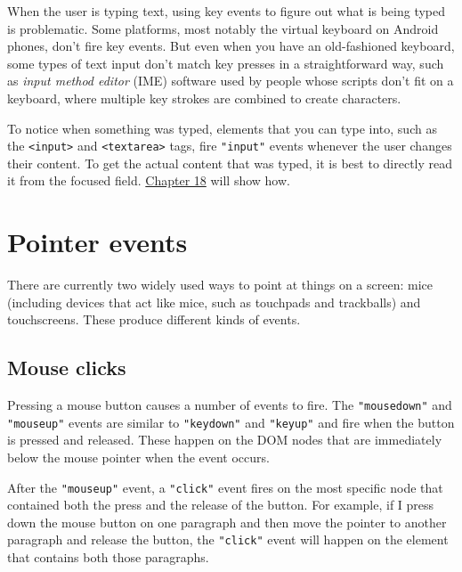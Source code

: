 When the user is typing text, using key events to figure out what is being typed is problematic. Some platforms, most notably the virtual
keyboard on Android phones, don't fire key events. But even when you have an old-fashioned keyboard, some types of text input don't match key presses in a straightforward way, such as \emph{input method editor} (IME) software used by people whose scripts don't fit on a keyboard, where multiple key strokes are combined to create characters.

To notice when something was typed, elements that you can type into, such as the \lstinline`<input>` and \lstinline`<textarea>` tags, fire \lstinline`"input"` events whenever the user changes their content. To get the actual content that was typed, it is best to directly read it from the focused field. \hyperref[http.forms]{Chapter 18} will show how.

\section{Pointer events}

There are currently two widely used ways to point at things on a screen: mice (including devices that act like mice, such as touchpads and trackballs) and touchscreens. These produce different kinds of events.

\subsection{Mouse clicks}

Pressing a mouse button causes a number of events to fire. The \lstinline`"mousedown"` and \lstinline`"mouseup"` events are similar to \lstinline`"keydown"` and \lstinline`"keyup"` and fire when the button is pressed and released. These happen on the DOM nodes that are immediately below the mouse pointer when the event occurs.

After the \lstinline`"mouseup"` event, a \lstinline`"click"` event fires on the most specific node that contained both the press and the release of the button. For example, if I press down the mouse button on one paragraph and then move the pointer to another paragraph and release the button, the \lstinline`"click"` event will happen on the element that contains both those paragraphs.


